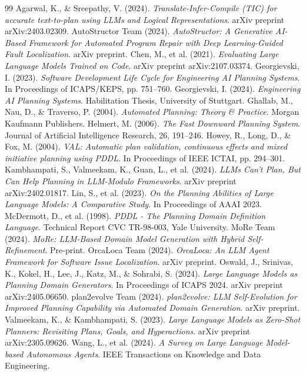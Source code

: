 \documentclass[11pt,a4paper]{report}
\begin{document}
\begin{thebibliography}{99}
 Agarwal, K., \& Sreepathy, V. (2024). \textit{Translate-Infer-Compile (TIC) for accurate text-to-plan using LLMs and Logical Representations}. arXiv preprint arXiv:2403.02309.
 AutoStructor Team (2024). \textit{AutoStructor: A Generative AI-Based Framework for Automated Program Repair with Deep Learning-Guided Fault Localization}. arXiv preprint.
 Chen, M., et al. (2021). \textit{Evaluating Large Language Models Trained on Code}. arXiv preprint arXiv:2107.03374.
 Georgievski, I. (2023). \textit{Software Development Life Cycle for Engineering AI Planning Systems}. In Proceedings of ICAPS/KEPS, pp. 751–760.
 Georgievski, I. (2024). \textit{Engineering AI Planning Systems}. Habilitation Thesis, University of Stuttgart.
 Ghallab, M., Nau, D., \& Traverso, P. (2004). \textit{Automated Planning: Theory \& Practice}. Morgan Kaufmann Publishers.
 Helmert, M. (2006). \textit{The Fast Downward Planning System}. Journal of Artificial Intelligence Research, 26, 191–246.
 Howey, R., Long, D., \& Fox, M. (2004). \textit{VAL: Automatic plan validation, continuous effects and mixed initiative planning using PDDL}. In Proceedings of IEEE ICTAI, pp. 294–301.
 Kambhampati, S., Valmeekam, K., Guan, L., et al. (2024). \textit{LLMs Can’t Plan, But Can Help Planning in LLM-Modulo Frameworks}. arXiv preprint arXiv:2402.01817.
 Lin, S., et al. (2023). \textit{On the Planning Abilities of Large Language Models: A Comparative Study}. In Proceedings of AAAI 2023.
 McDermott, D., et al. (1998). \textit{PDDL - The Planning Domain Definition Language}. Technical Report CVC TR-98-003, Yale University.
 MoRe Team (2024). \textit{MoRe: LLM-Based Domain Model Generation with Hybrid Self-Refinement}. Pre-print.
 OrcaLoca Team (2024). \textit{OrcaLoca: An LLM Agent Framework for Software Issue Localization}. arXiv preprint.
 Oswald, J., Srinivas, K., Kokel, H., Lee, J., Katz, M., \& Sohrabi, S. (2024). \textit{Large Language Models as Planning Domain Generators}. In Proceedings of ICAPS 2024. arXiv preprint arXiv:2405.06650.
 plan2evolve Team (2024). \textit{plan2evolve: LLM Self-Evolution for Improved Planning Capability via Automated Domain Generation}. arXiv preprint.
 Valmeekam, K., \& Kambhampati, S. (2023). \textit{Large Language Models as Zero-Shot Planners: Revisiting Plans, Goals, and Hyperactions}. arXiv preprint arXiv:2305.09626.
 Wang, L., et al. (2024). \textit{A Survey on Large Language Model-based Autonomous Agents}. IEEE Transactions on Knowledge and Data Engineering.
\end{thebibliography}
\end{document}
